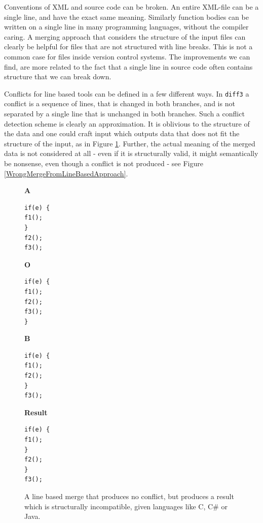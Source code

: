 \documentclass[11pt]{article}
\begin{document}
Conventions of XML and source code can be broken. An entire XML-file can be a single line, and have the exact same meaning. Similarly function bodies can be written on a single line in many programming languages, without the compiler caring. A merging approach that considers the structure of the input files can clearly be helpful for files that are not structured with line breaks. This is not a common case for files inside version control systems. The improvements we can find, are more related to the fact that a single line in source code often contains structure that we can break down.

Conflicts for line based tools can be defined in a few different ways. In \texttt{diff3} a conflict is a sequence of lines, that is changed in both branches, and is not separated by a single line that is unchanged in both branches. Such a conflict detection scheme is clearly an approximation. It is oblivious to the structure of the data and one could craft input which outputs data that does not fit the structure of the input, as in Figure \ref{WrongMergeFromLineBasedApproach2}. Further, the  actual meaning of the merged data is not considered at all - even if it is structurally valid, it might semantically be nonsense, even though a conflict is not produced - see Figure \ref{WrongMergeFromLineBasedApproach}.


\begin{figure}

\begin{multicols*}{4}

\textbf{A}


\begin{lstlisting}[language=CSharp]
if(e) {
f1();
}
f2();
f3();

\end{lstlisting}

\columnbreak

\textbf{O}

\begin{lstlisting}[language=CSharp]
if(e) {
f1();
f2();
f3();
}

\end{lstlisting}

\columnbreak

\textbf{B}
 
\begin{lstlisting}[language=CSharp]
if(e) {
f1();
f2();
}
f3();

\end{lstlisting}

\columnbreak

\textbf{Result}
 
\begin{lstlisting}[language=CSharp]
if(e) {
f1();
}
f2();
}
f3();
\end{lstlisting}
\end{multicols*}
\caption{A line based merge that produces no conflict, but produces a result which is structurally incompatible, given languages like C, C\# or Java.}
\label{WrongMergeFromLineBasedApproach2}

\end{figure}
\end{document}
